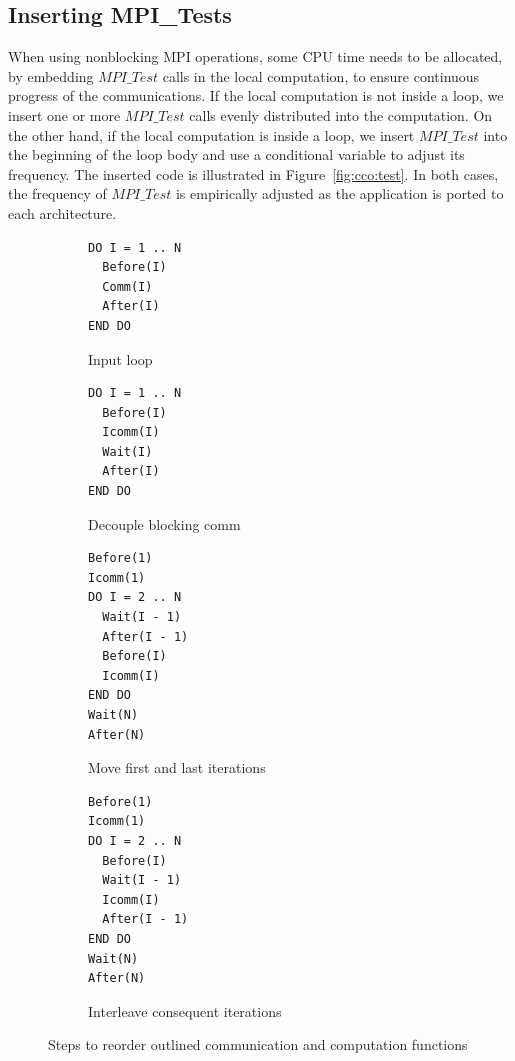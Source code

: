 \subsection{Inserting MPI\_Tests}

When using nonblocking MPI operations, some CPU time needs to be
allocated, by embedding $MPI\_Test$ calls in the local computation, to
ensure continuous progress of the communications.  If the local
computation is not inside a loop, we insert one or more $MPI\_Test$
calls evenly distributed into the computation.  On the other hand, if
the local computation is inside a loop, we insert $MPI\_Test$ into the
beginning of the loop body and use a conditional variable to adjust
its frequency.  The inserted code is illustrated in
Figure~\ref{fig:cco:test}.  In both cases, the frequency of
$MPI\_Test$ is empirically adjusted as the application is ported to
each architecture.

\begin{figure}
{\scriptsize
  \centering
  \begin{subfigure}[b]{.25\textwidth}
\begin{verbatim}
DO I = 1 .. N
  Before(I)
  Comm(I)
  After(I)
END DO
\end{verbatim}
    \caption{Input loop}
    \label{fig:cco:reorder:a}
    \vspace{.1in}
  \end{subfigure}
  \begin{subfigure}[b]{.25\textwidth}
\begin{verbatim}
DO I = 1 .. N
  Before(I)
  Icomm(I)
  Wait(I)
  After(I)
END DO
\end{verbatim}
    \caption{Decouple blocking comm}
    \label{fig:cco:reorder:b}
    \vspace{.1in}
  \end{subfigure}
  \begin{subfigure}[b]{.25\textwidth}
\begin{verbatim}
Before(1)
Icomm(1)
DO I = 2 .. N
  Wait(I - 1)
  After(I - 1)
  Before(I)
  Icomm(I)
END DO
Wait(N)
After(N)
\end{verbatim}
    \caption{Move first and last iterations}
    \label{fig:cco:reorder:c}
  \end{subfigure}
  \begin{subfigure}[b]{.25\textwidth}
\begin{verbatim}
Before(1)
Icomm(1)
DO I = 2 .. N
  Before(I)
  Wait(I - 1)
  Icomm(I)
  After(I - 1)
END DO
Wait(N)
After(N)
\end{verbatim}
    \caption{Interleave consequent iterations}
    \label{fig:cco:reorder:d}
  \end{subfigure}
\caption{Steps to reorder outlined communication and computation functions}
\label{fig:cco:reorder}
}
\end{figure}

